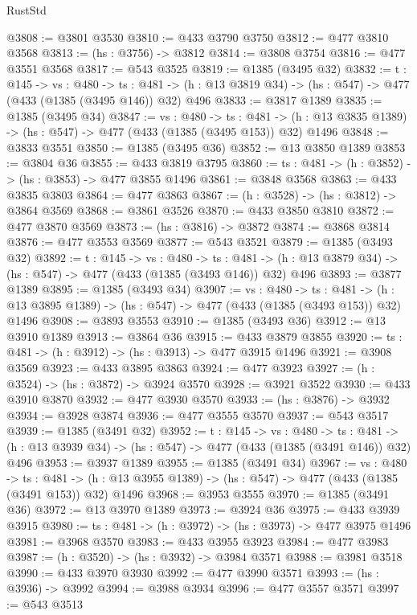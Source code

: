 \begin{lexlean}{RustStd}
\begin{coremodule}
@3808 := @3801 @3530
@3810 := @433 @3790 @3750
@3812 := @477 @3810 @3568
@3813 := (hs : @3756) -> @3812
@3814 := @3808 @3754
@3816 := @477 @3551 @3568
@3817 := @543 @3525
@3819 := @1385 (@3495 @32)
@3832 := {t : @145} ->
  {vs : @480} ->
  {ts : @481} -> (h : @13 @3819 @34) -> (hs : @547) -> @477 (@433 (@1385 (@3495 @146)) @32) @496
@3833 := @3817 @1389
@3835 := @1385 (@3495 @34)
@3847 := {vs : @480} ->
  {ts : @481} -> (h : @13 @3835 @1389) -> (hs : @547) -> @477 (@433 (@1385 (@3495 @153)) @32) @1496
@3848 := @3833 @3551
@3850 := @1385 (@3495 @36)
@3852 := @13 @3850 @1389
@3853 := @3804 @36
@3855 := @433 @3819 @3795
@3860 := {ts : @481} -> (h : @3852) -> (hs : @3853) -> @477 @3855 @1496
@3861 := @3848 @3568
@3863 := @433 @3835 @3803
@3864 := @477 @3863
@3867 := (h : @3528) -> (hs : @3812) -> @3864 @3569
@3868 := @3861 @3526
@3870 := @433 @3850 @3810
@3872 := @477 @3870 @3569
@3873 := (hs : @3816) -> @3872
@3874 := @3868 @3814
@3876 := @477 @3553 @3569
@3877 := @543 @3521
@3879 := @1385 (@3493 @32)
@3892 := {t : @145} ->
  {vs : @480} ->
  {ts : @481} -> (h : @13 @3879 @34) -> (hs : @547) -> @477 (@433 (@1385 (@3493 @146)) @32) @496
@3893 := @3877 @1389
@3895 := @1385 (@3493 @34)
@3907 := {vs : @480} ->
  {ts : @481} -> (h : @13 @3895 @1389) -> (hs : @547) -> @477 (@433 (@1385 (@3493 @153)) @32) @1496
@3908 := @3893 @3553
@3910 := @1385 (@3493 @36)
@3912 := @13 @3910 @1389
@3913 := @3864 @36
@3915 := @433 @3879 @3855
@3920 := {ts : @481} -> (h : @3912) -> (hs : @3913) -> @477 @3915 @1496
@3921 := @3908 @3569
@3923 := @433 @3895 @3863
@3924 := @477 @3923
@3927 := (h : @3524) -> (hs : @3872) -> @3924 @3570
@3928 := @3921 @3522
@3930 := @433 @3910 @3870
@3932 := @477 @3930 @3570
@3933 := (hs : @3876) -> @3932
@3934 := @3928 @3874
@3936 := @477 @3555 @3570
@3937 := @543 @3517
@3939 := @1385 (@3491 @32)
@3952 := {t : @145} ->
  {vs : @480} ->
  {ts : @481} -> (h : @13 @3939 @34) -> (hs : @547) -> @477 (@433 (@1385 (@3491 @146)) @32) @496
@3953 := @3937 @1389
@3955 := @1385 (@3491 @34)
@3967 := {vs : @480} ->
  {ts : @481} -> (h : @13 @3955 @1389) -> (hs : @547) -> @477 (@433 (@1385 (@3491 @153)) @32) @1496
@3968 := @3953 @3555
@3970 := @1385 (@3491 @36)
@3972 := @13 @3970 @1389
@3973 := @3924 @36
@3975 := @433 @3939 @3915
@3980 := {ts : @481} -> (h : @3972) -> (hs : @3973) -> @477 @3975 @1496
@3981 := @3968 @3570
@3983 := @433 @3955 @3923
@3984 := @477 @3983
@3987 := (h : @3520) -> (hs : @3932) -> @3984 @3571
@3988 := @3981 @3518
@3990 := @433 @3970 @3930
@3992 := @477 @3990 @3571
@3993 := (hs : @3936) -> @3992
@3994 := @3988 @3934
@3996 := @477 @3557 @3571
@3997 := @543 @3513

\end{coremodule}
\end{lexlean}
